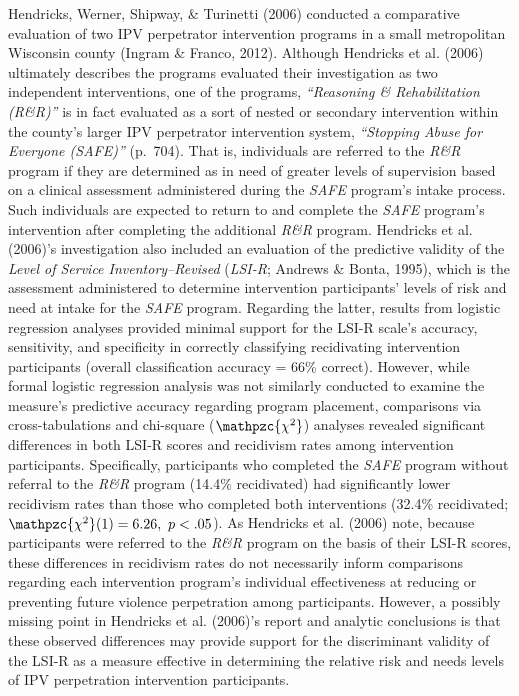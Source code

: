 \documentclass[11pt,]{tufte-book}
\newcommand{\chisq}{\mathpzc{\chi^{2}}}
\begin{document}
Hendricks, Werner, Shipway, \& Turinetti (2006) conducted a comparative
evaluation of two IPV perpetrator intervention programs in a small
metropolitan Wisconsin county (Ingram \& Franco, 2012). Although
Hendricks et al. (2006) ultimately describes the programs evaluated
their investigation as two independent interventions, one of the
programs, \emph{``Reasoning \& Rehabilitation (R\&R)''} is in fact
evaluated as a sort of nested or secondary intervention within the
county's larger IPV perpetrator intervention system, \emph{``Stopping
Abuse for Everyone (SAFE)''} (p.~704). That is, individuals are referred
to the \emph{R\&R} program if they are determined as in need of greater
levels of supervision based on a clinical assessment administered during
the \emph{SAFE} program's intake process. Such individuals are expected
to return to and complete the \emph{SAFE} program's intervention after
completing the additional \emph{R\&R} program. Hendricks et al. (2006)'s
investigation also included an evaluation of the predictive validity of
the \emph{Level of Service Inventory--Revised} (\emph{LSI-R}; Andrews \&
Bonta, 1995), which is the assessment administered to determine
intervention participants' levels of risk and need at intake for the
\emph{SAFE} program. Regarding the latter, results from logistic
regression analyses provided minimal support for the LSI-R scale's
accuracy, sensitivity, and specificity in correctly classifying
recidivating intervention participants (overall classification accuracy
= 66\% correct). However, while formal logistic regression analysis was
not similarly conducted to examine the measure's predictive accuracy
regarding program placement, comparisons via cross-tabulations and
chi-square (\(\chisq\)) analyses revealed significant differences in
both LSI-R scores and recidivism rates among intervention participants.
Specifically, participants who completed the \emph{SAFE} program without
referral to the \emph{R\&R} program (14.4\% recidivated) had
significantly lower recidivism rates than those who completed both
interventions (32.4\% recidivated; \(\chisq(1) = 6.26,~p < .05\)). As
Hendricks et al. (2006) note, because participants were referred to the
\emph{R\&R} program on the basis of their LSI-R scores, these
differences in recidivism rates do not necessarily inform comparisons
regarding each intervention program's individual effectiveness at
reducing or preventing future violence perpetration among participants.
However, a possibly missing point in Hendricks et al. (2006)'s report
and analytic conclusions is that these observed differences may provide
support for the discriminant validity of the LSI-R as a measure
effective in determining the relative risk and needs levels of IPV
perpetration intervention participants.
\end{document}

